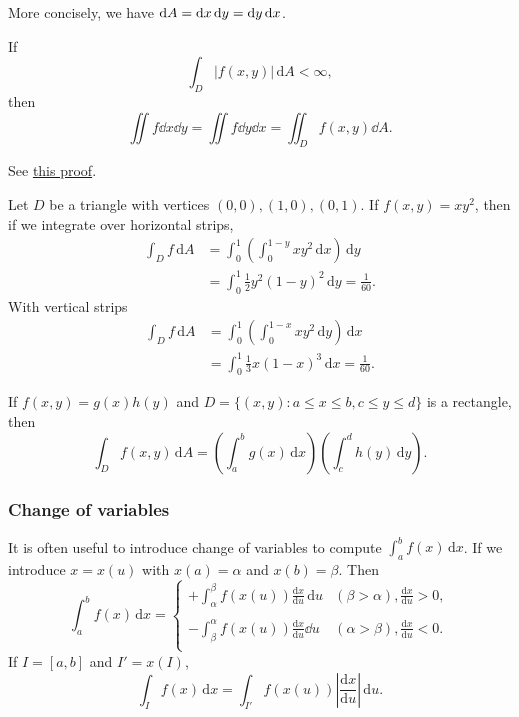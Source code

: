 More concisely, we have $ \mathrm{d} A = \mathrm{d} x\,\mathrm{d} y=\mathrm{d} y\,\mathrm{d} x $.
\begin{theorem}\label{thm:Fubini's theorem}
    If
    \[
        \int_{D} \left| f(x,y) \right| \,\mathrm{d}A<\infty,
    \]
    then 
    \[
        \iint f\dd x\dd y = \iint f\dd y\dd x = \iint_{D}f(x,y)\dd A.
    \]
\end{theorem}
See \href{https://dec41.user.srcf.net/notes/II_M/probability_and_measure.pdf\#page=50}{this proof}.

\begin{example}
    Let $D$ be a triangle with vertices $(0,0),(1,0),(0,1)$. If $f(x,y)=xy^2$, then if we integrate over horizontal strips,
    \begin{align*}
        \int_{D} f \,\mathrm{d}A &= \int_{0}^{1} \left( \int_{0}^{1-y} xy^2 \,\mathrm{d}x \right) \,\mathrm{d}y\\ 
        &= \int_{0}^{1} \frac{1}{2}y^2(1-y)^2 \,\mathrm{d}y = \frac{1}{60}.
    \end{align*}
    With vertical strips 
    \begin{align*}
        \int_{D} f \,\mathrm{d}A &= \int_{0}^{1} \left( \int_{0}^{1-x} xy^2 \,\mathrm{d}y \right) \,\mathrm{d}x\\ 
        &= \int_{0}^{1} \frac{1}{3}x(1-x)^3 \,\mathrm{d}x = \frac{1}{60}.
    \end{align*}
\end{example}

\begin{proposition}
    If $f(x,y)=g(x)h(y)$ and $ D=\{(x,y):a\le x\le b,c\le y\le d\} $ is a rectangle, then 
    \[
        \int_{D} f(x,y) \,\mathrm{d}A = \left( \int_{a}^{b} g(x) \,\mathrm{d}x \right) \left( \int_{c}^{d} h(y) \,\mathrm{d}y \right).
    \]
\end{proposition}

\subsubsection{Change of variables}

It is often useful to introduce change of variables to compute $ \int_{a}^{b} f(x) \,\mathrm{d}x $. If we introduce $ x=x(u) $ with $ x(a)=\alpha $ and $ x(b)=\beta $. Then 
\[
    \int_{a}^{b} f(x) \,\mathrm{d}x = \begin{cases}
    \displaystyle+\int_{\alpha}^{\beta} f(x(u))\frac{\mathrm{d}x}{\mathrm{d}u}  \,\mathrm{d}u &\displaystyle(\beta>\alpha),\frac{\mathrm{d}x}{\mathrm{d}u}>0, \\
    \\
    \displaystyle-\int_{\beta}^{\alpha} f(x(u))\frac{\mathrm{d}x}{\mathrm{d}u}\dd u &\displaystyle(\alpha>\beta),\frac{\mathrm{d}x}{\mathrm{d}u}<0. \\
    \end{cases} 
\]
If $I=[a,b]$ and $I'=x(I)$,
\[
    \int_{I} f(x) \,\mathrm{d}x = \int_{I'} f(x(u)) \left| \frac{\mathrm{d}x}{\mathrm{d}u}  \right|  \,\mathrm{d}u.
\]

